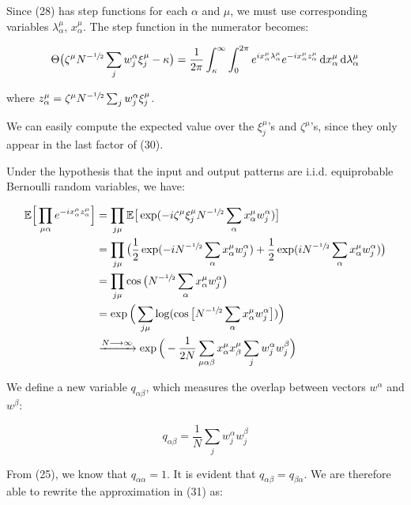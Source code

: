 Since (28) has step functions for each $\alpha$ and $\mu$, we must use corresponding variables $\lambda_\alpha^\mu$, $x_\alpha^\mu$. The step function in the numerator becomes:

\begin{equation}
    \Theta \big( \zeta^\mu N^{-\sfrac{1}{2}} \sum_j w_{j}^\alpha \xi_j^\mu - \kappa \big) = \frac{1}{2\pi}\int_\kappa^{\infty} \int_0^{2 \pi} e^{ix_\alpha^\mu\lambda_\alpha^\mu} e^{-ix_\alpha^\mu z_\alpha^\mu} \, \mathrm{d} x_\alpha^\mu \, \mathrm{d} \lambda_\alpha^\mu
\end{equation}

\noindent where $z_\alpha^\mu = \zeta^\mu N^{-\sfrac{1}{2}} \sum_j w_{j}^\alpha \xi_j^\mu$.

We can easily compute the expected value over the $\xi_j^\mu$'s and $\zeta^\mu$'s, since they only appear in the last factor of (30).

Under the hypothesis that the input and output patterns are i.i.d. equiprobable Bernoulli random variables, we have:

\begin{align}
    \mathbb{E} \Big[ \prod_{\mu\alpha} e^{-ix_\alpha^\mu z_\alpha^\mu} \Big]
    &= \prod_{j\mu} \mathbb{E} \big[ \exp(-i\zeta^\mu \xi_j^\mu N^{-\sfrac{1}{2}} \sum_\alpha x_\alpha^\mu w_{j}^\alpha) \big] \nonumber \\
    &= \prod_{j\mu} \big( \frac{1}{2}\exp(-iN^{-\sfrac{1}{2}} \sum_\alpha x_\alpha^\mu w_{j}^\alpha) + \frac{1}{2} \exp(iN^{-\sfrac{1}{2}} \sum_\alpha x_\alpha^\mu w_{j}^\alpha) \big) \nonumber \\
    &= \prod_{j\mu} \cos \big( N^{-\sfrac{1}{2}} \sum_\alpha x_\alpha^\mu w_{j}^\alpha \big) \nonumber \\
    &= \exp \Big( \sum_{j\mu} \log (\cos \big[ N^{-\sfrac{1}{2}} \sum_\alpha x_\alpha^\mu w_{j}^\alpha \big] ) \Big) \nonumber \\
    &\xrightarrow{N \longrightarrow \infty} \exp \Big( -\frac{1}{2N} \sum_{\mu\alpha\beta} x_\alpha^\mu x_\beta^\mu \sum_j w_j^\alpha w_j^\beta \Big)
\end{align}

We define a new variable $q_{\alpha\beta}$, which measures the overlap between vectors $w^\alpha$ and $w^\beta$:

\begin{equation}
    q_{\alpha\beta} = \frac{1}{N} \sum_j w_j^\alpha w_j^\beta
\end{equation}

From (25), we know that $q_{\alpha\alpha} = 1$. It is evident that $q_{\alpha\beta} = q_{\beta\alpha}$. We are therefore able to rewrite the approximation in (31) as:

